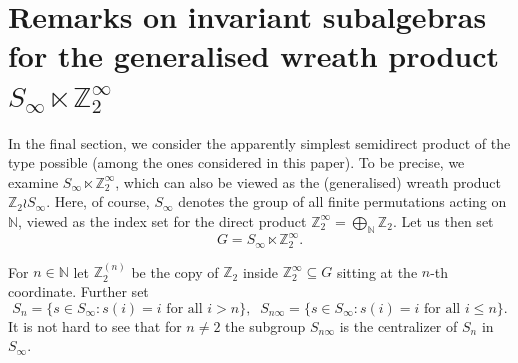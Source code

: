 \documentclass[11pt]{amsart}
\newcommand{\N}{\mathbb N}
\newcommand{\Z}{\mathbb Z}
\theoremstyle{plain}
\theoremstyle{definition}
\theoremstyle{remark}
\numberwithin{equation}{section}
\begin{document}
\section{Remarks on invariant subalgebras for the generalised wreath product $S_\infty \ltimes \Z_2^\infty$}
\label{sec:wreath}

In the final section, we consider the apparently simplest semidirect product of the type possible (among the ones considered in this paper). To be precise, we examine $S_\infty \ltimes \Z_2^\infty$, which can also be viewed as the (generalised) wreath product $\mathbb{Z}_2 \wr S_\infty$. Here, of course, $S_\infty$ denotes the group of all finite permutations acting on $\N$, viewed as the index set for the direct product $\Z_2^\infty = \bigoplus_{\N} \Z_2$. Let us then set
\[ G = S_\infty \ltimes \Z_2^\infty. \]

For $n\in\mathbb N$ let $\mathbb Z_2^{(n)}$ be the copy of $\mathbb Z_2$ inside $\mathbb Z_2^\infty\subseteq G$ sitting at the $n$-th coordinate. Further set $$S_n=\{s\in S_\infty: s(i)=i\text{ for all }i>n\},\;\;S_{n\infty}=\{s\in S_\infty:s(i)=i\text{ for all }i\leqslant n\}.$$ It is not hard to see that for $n\neq 2$ the subgroup $S_{n\infty}$ is the centralizer of $S_n$ in $S_\infty$.
\end{document}
